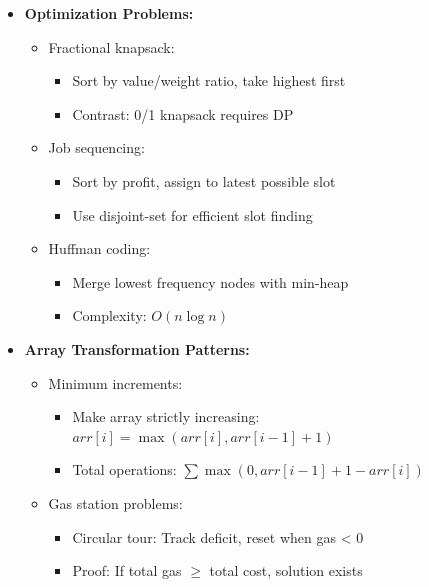 \documentclass[a4paper,10pt]{book}
\begin{document}
\begin{itemize}
    \item \textbf{Optimization Problems:}
    \begin{itemize}
        \item Fractional knapsack:
        \begin{itemize}
            \item Sort by value/weight ratio, take highest first
            \item Contrast: 0/1 knapsack requires DP
        \end{itemize}
        \item Job sequencing:
        \begin{itemize}
            \item Sort by profit, assign to latest possible slot
            \item Use disjoint-set for efficient slot finding
        \end{itemize}
        \item Huffman coding:
        \begin{itemize}
            \item Merge lowest frequency nodes with min-heap
            \item Complexity: $O(n \log n)$
        \end{itemize}
    \end{itemize}
    
    \item \textbf{Array Transformation Patterns:}
    \begin{itemize}
        \item Minimum increments:
        \begin{itemize}
            \item Make array strictly increasing: $arr[i] = \max(arr[i], arr[i-1]+1)$
            \item Total operations: $\sum \max(0, arr[i-1]+1 - arr[i])$
        \end{itemize}
        \item Gas station problems:
        \begin{itemize}
            \item Circular tour: Track deficit, reset when gas < 0
            \item Proof: If total gas $\geq$ total cost, solution exists
        \end{itemize}
    \end{itemize}
    

\end{itemize}
\end{document}
